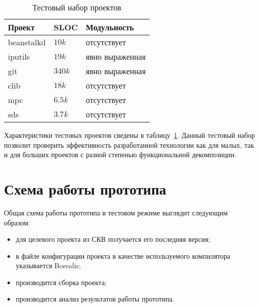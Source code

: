 \begin{table}
\caption{Тестовый набор проектов}
\begin{center}
\begin{tabular}{|l|l|l|}
\hline 
\textbf{Проект} & \textbf{SLOC} & \textbf{Модульность}  \\ 
\hline 
beanstalkd & $10k$ & отсутствует \\ 
\hline 
iputils & $19k$ & явно выраженная \\ 
\hline 
git & $340k$ & явно выраженная \\ 
\hline 
clib & $18k$ & отсутствует \\ 
\hline 
mpc & $6.5k$ & отсутствует \\ 
\hline 
sds & $3.7k$ & отсутствует \\ 
\hline 
\end{tabular} 
\end{center}
\label{table:testProjects}
\end{table}

Характеристики тестовых проектов сведены в таблицу~\ref{table:testProjects}. 
Данный тестовый набор позволит проверить эффективность разработан­ной 
технологии как для малых, так и для больших проектов с разной степенью 
функциональной декомпозиции.

\section{Схема работы прототипа}
Общая схема работы прототипа в тестовом режиме выглядит следующим образом:
\begin{itemize}
\item для целевого проекта из СКВ получается его последняя версия;
\item в файле конфигурации проекта в качестве используемого компилятора 
указывается Borealis;
\item производится сборка проекта;
\item производится анализ результатов работы прототипа.
\end{itemize}

